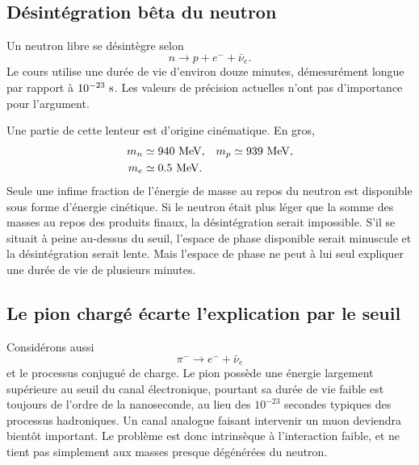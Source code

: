 \subsection{Désintégration bêta du neutron}

Un neutron libre se désintègre selon
\begin{equation}
n\longrightarrow p+e^-+\bar\nu_e.
\label{eq:l5-neutron-decay-intro}
\end{equation}
Le cours utilise une durée de vie d’environ douze minutes, démesurément longue par rapport à \(10^{-23}\ {\rm s}\). Les valeurs de précision actuelles n’ont pas d’importance pour l’argument.

Une partie de cette lenteur est d’origine cinématique. En gros,
\begin{equation}
\begin{aligned}
m_n&\simeq940\ {\rm MeV},
&
m_p&\simeq939\ {\rm MeV},
\\
m_e&\simeq0.5\ {\rm MeV}.
\end{aligned}
\end{equation}
Seule une infime fraction de l’énergie de masse au repos du neutron est disponible sous forme d’énergie cinétique. Si le neutron était plus léger que la somme des masses au repos des produits finaux, la désintégration serait impossible. S’il se situait à peine au-dessus du seuil, l’espace de phase disponible serait minuscule et la désintégration serait lente. Mais l’espace de phase ne peut à lui seul expliquer une durée de vie de plusieurs minutes.

\subsection{Le pion chargé écarte l’explication par le seuil}

Considérons aussi
\begin{equation}
\pi^-\longrightarrow e^-+\bar\nu_e
\end{equation}
et le processus conjugué de charge. Le pion possède une énergie largement supérieure au seuil du canal électronique, pourtant sa durée de vie faible est toujours de l’ordre de la nanoseconde, au lieu des \(10^{-23}\) secondes typiques des processus hadroniques. Un canal analogue faisant intervenir un muon deviendra bientôt important. Le problème est donc intrinsèque à l’interaction faible, et ne tient pas simplement aux masses presque dégénérées du neutron.


